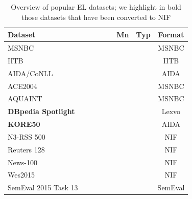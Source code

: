 \documentclass[sigconf]{acmart}
\newcommand{\cmark}{\ding{51}}%
\newcommand{\xmark}{\ding{55}}%
\begin{document}
\newcommand{\ccell}[1]{\multicolumn{1}{c}{#1}}
\newcommand{\rcell}[1]{\multicolumn{1}{r}{#1}}
\begin{table}[tb!]
\centering
\caption{Overview of popular EL datasets; we highlight in bold those datasets that have been converted to NIF \label{tab:datasets}} 
\begin{tabular}{lccc}
\toprule
\textbf{Dataset}~~~~~~~~~~~~~~~~~~ & \ccell{\textbf{Mn}} & \ccell{\textbf{Typ}}&\ccell{\textbf{Format}}\\\midrule
MSNBC~\cite{cucerzan2007large}      &\xmark &\xmark & MSNBC \\ %
IITB~\cite{IITB2009}                &\cmark &\xmark & IITB  \\ %
AIDA/CoNLL~\cite{aida2011}          &\cmark &\xmark & AIDA  \\ %
ACE2004~\cite{aquaint}              &\xmark &\xmark & MSNBC \\ %
AQUAINT~\cite{aquaint}              &\xmark &\xmark & MSNBC \\ %
\textbf{DBpedia Spotlight}
\cite{mendes2011dbpedia}            &\cmark &\xmark & Lexvo \\ %
\textbf{KORE50}~\cite{kore50}       &\cmark &\xmark & AIDA  \\ %
N3-RSS 500~\cite{N3}                &\cmark &\xmark & NIF   \\ %
Reuters 128~\cite{N3}               &\cmark &\xmark & NIF   \\ %
News-100~\cite{N3}                  &\cmark &\xmark & NIF   \\ %
Wes2015~\cite{wes2015}              &\cmark &\xmark & NIF   \\ %
SemEval 2015 
Task 13~\cite{moro2015semeval}      &\cmark &\xmark & SemEval \\ %

\end{tabular}
\end{table}
\end{document}

